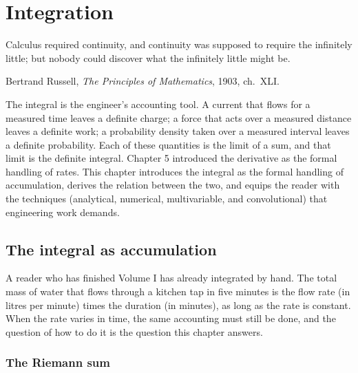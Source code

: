 \chapter{Integration}
\label{vol02:ch06}

\epigraph{Calculus required continuity, and continuity was supposed to
require the infinitely little; but nobody could discover what the
infinitely little might be.}{Bertrand Russell, \emph{The Principles of
Mathematics}, 1903, ch.~XLI.}


\noindent
The integral is the engineer's accounting tool. A current that flows
for a measured time leaves a definite charge; a force that acts over a
measured distance leaves a definite work; a probability density taken
over a measured interval leaves a definite probability. Each of these
quantities is the limit of a sum, and that limit is the definite
integral. Chapter 5 introduced the derivative as the formal handling
of rates. This chapter introduces the integral as the formal handling
of accumulation, derives the relation between the two, and equips the
reader with the techniques (analytical, numerical, multivariable, and
convolutional) that engineering work demands.

\section{The integral as accumulation}

A reader who has finished Volume I has already integrated by hand. The
total mass of water that flows through a kitchen tap in five minutes
is the flow rate (in litres per minute) times the duration (in
minutes), as long as the rate is constant. When the rate varies in
time, the same accounting must still be done, and the question of how
to do it is the question this chapter answers.

\subsection{The Riemann sum}

